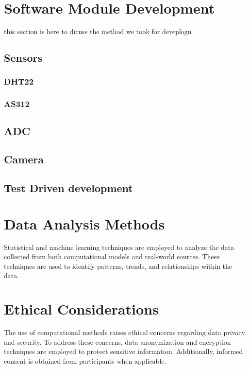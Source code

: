 \section{Software Module Development}
this section is here to dicuss the method we took  for  deveplogn
\subsection{Sensors}
\subsubsection{DHT22}

\subsubsection{AS312}


\subsection{ADC}
\subsection{Camera}

\subsection{Test Driven development}

\section{Data Analysis Methods}

Statistical and machine learning techniques are employed to analyze the data collected from both computational models and real-world sources. These techniques are used to identify patterns, trends, and relationships within the data.

\section{Ethical Considerations}

The use of computational methods raises ethical concerns regarding data privacy and security. To address these concerns, data anonymization and encryption techniques are employed to protect sensitive information. Additionally, informed consent is obtained from participants when applicable.

